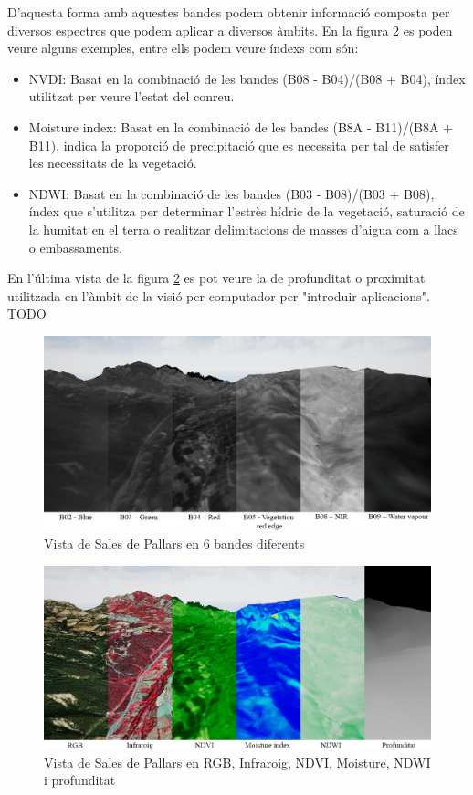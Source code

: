 \documentclass[10pt,a4paper,twocolumn,twoside]{article}
\begin{document}
D'aquesta forma amb aquestes bandes podem obtenir informació composta per diversos espectres que podem aplicar a diversos àmbits. En la figura \ref{fig-spectralindexes} es poden veure alguns exemples, entre ells podem veure índexs com són:

\begin{itemize}
\item 
{
	NVDI\cite{ndvi}: Basat en la combinació de les bandes (B08 - B04)/(B08 + B04), índex utilitzat per veure l'estat del conreu.
}
\item
{
	Moisture index\cite{moisture}: Basat en la combinació de les bandes (B8A - B11)/(B8A + B11), indica la proporció de precipitació que es necessita per tal de satisfer les necessitats de la vegetació.
}
\item
{
	NDWI\cite{ndwi}: Basat en la combinació de les bandes (B03 - B08)/(B03 + B08), índex que s'utilitza per determinar l'estrès hídric de la vegetació, saturació de la humitat en el terra o realitzar delimitacions de masses d'aigua com a llacs o embassaments.
}
\end{itemize} 

En l'última vista de la figura \ref{fig-spectralindexes} es pot veure la de profunditat o proximitat utilitzada en l'àmbit de la visió per computador per "introduir aplicacions". TODO

\begin{figure}[!h]
\centering
  	\includegraphics[width=1\textwidth]{multispectral/bands}
	\caption{Vista de Sales de Pallars en 6 bandes diferents}
	\label{fig-bands}
\end{figure}

\begin{figure}[!h]
\centering
  	\includegraphics[width=1\textwidth]{multispectral/spectralindexes}
	\caption{Vista de Sales de Pallars en RGB, Infraroig, NDVI, Moisture, NDWI i profunditat}
	\label{fig-spectralindexes}
\end{figure}
\end{document}

